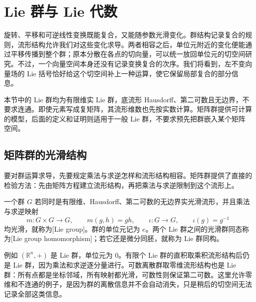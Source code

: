 
% 
% 

\section{Lie 群与 Lie 代数}
\label{g1:sec:1601}

旋转、平移和可逆线性变换既能复合，又能随参数光滑变化。群结构记录复合的规则，流形结构允许我们对这些变化求导。两者相容之后，单位元附近的变化便能通过平移传播到整个群；原本分散在各点的切向量，可以统一放回单位元的切空间研究。不过，一个向量空间本身还没有记录变换复合的次序。我们将看到，左不变向量场的 Lie 括号恰好给这个切空间补上一种运算，使它保留局部复合的部分信息。

\ProseParagraphBreak

本节中的 Lie 群均为有限维实 Lie 群，底流形 Hausdorff、第二可数且无边界，不要求连通。即使元素写成复矩阵，其流形维数也先按实数计算。矩阵群提供可计算的模型，后面的定义和证明则适用于一般 Lie 群，不要求预先把群嵌入某个矩阵空间。

\subsection{矩阵群的光滑结构}
\label{g1:subsec:1601:01}

要对群运算求导，先要规定乘法与求逆怎样和流形结构相容。矩阵群提供了直接的检验方法：先由矩阵方程建立流形结构，再把乘法与求逆限制到这个流形上。

\begin{definition}[Lie 群]\label{g1:def:lie-group}
	一个群 \(G\) 若同时是有限维、Hausdorff、第二可数的无边界实光滑流形，并且乘法与求逆映射
	\[
		m:G\times G\longrightarrow G,\qquad m(g,h)=gh,
		\qquad
		\iota:G\longrightarrow G,\qquad \iota(g)=g^{-1}
	\]
	均光滑，就称为[Lie group]。群的单位元记为 \(e\)。两个 Lie 群之间的光滑群同态称为[Lie group homomorphism]；若它还是微分同胚，就称为 Lie 群同构。
\end{definition}

例如 \((\mathbb R^n,+)\) 是 Lie 群，单位元为 \(0\)。有限个 Lie 群的直积取乘积流形结构后仍是 Lie 群，因为乘法和求逆逐分量进行。可数离散群取零维流形结构也是 Lie 群：所有点都是坐标邻域，所有映射都光滑，可数性则保证第二可数。这里允许零维和不连通的例子，是因为群的离散信息并不会自动消失，只是稍后的切空间无法记录全部这类信息。


